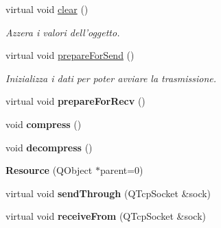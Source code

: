 \begin{DoxyCompactItemize}
\item 
virtual void \hyperlink{class_k_cloud_1_1_resource_aa1f3747d1d39bff3f659d499f0a65c79}{clear} ()
\begin{DoxyCompactList}\small\item\em Azzera i valori dell'oggetto. \end{DoxyCompactList}\item 
virtual void \hyperlink{class_k_cloud_1_1_resource_a87f2ba117ca6054c29ce303628302f1b}{prepare\-For\-Send} ()
\begin{DoxyCompactList}\small\item\em Inizializza i dati per poter avviare la trasmissione. \end{DoxyCompactList}\item 
\hypertarget{class_k_cloud_1_1_resource_a72ef4c24346982bf78a8654f324064c0}{virtual void {\bfseries prepare\-For\-Recv} ()}\label{class_k_cloud_1_1_resource_a72ef4c24346982bf78a8654f324064c0}

\item 
\hypertarget{class_k_cloud_1_1_resource_a03a50aa73def109914c497eff7776cdb}{void {\bfseries compress} ()}\label{class_k_cloud_1_1_resource_a03a50aa73def109914c497eff7776cdb}

\item 
\hypertarget{class_k_cloud_1_1_resource_a459ff08f0f8525d413fed943604774e3}{void {\bfseries decompress} ()}\label{class_k_cloud_1_1_resource_a459ff08f0f8525d413fed943604774e3}

\item 
\hypertarget{class_k_cloud_1_1_resource_a3dd2afa53e60ac97f16f50e8f82a7bcd}{{\bfseries Resource} (Q\-Object $\ast$parent=0)}\label{class_k_cloud_1_1_resource_a3dd2afa53e60ac97f16f50e8f82a7bcd}

\item 
\hypertarget{class_k_cloud_1_1_resource_ab8e5d63066d15a4459baf5445fceb5cf}{virtual void {\bfseries send\-Through} (Q\-Tcp\-Socket \&sock)}\label{class_k_cloud_1_1_resource_ab8e5d63066d15a4459baf5445fceb5cf}

\item 
\hypertarget{class_k_cloud_1_1_resource_a9206de8a61e5499ef9dd65ea34905532}{virtual void {\bfseries receive\-From} (Q\-Tcp\-Socket \&sock)}\label{class_k_cloud_1_1_resource_a9206de8a61e5499ef9dd65ea34905532}

\end{DoxyCompactItemize}
